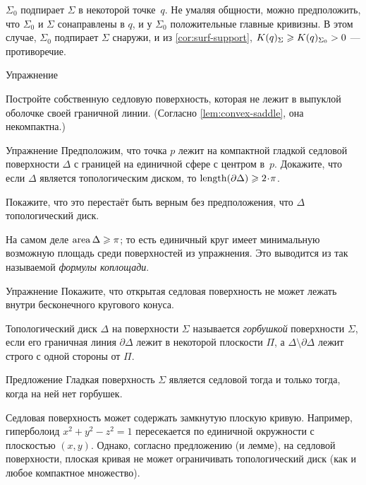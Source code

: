 $\Sigma_0$ подпирает $\Sigma$ в некоторой точке~$q$.
Не умаляя общности, можно предположить, что $\Sigma_0$ и $\Sigma$ сонаправлены в $q$, и у $\Sigma_0$ положительные главные кривизны.
В этом случае, $\Sigma_0$ подпирает $\Sigma$ снаружи,
и из \ref{cor:surf-support}, $K(q)_\Sigma\z\ge K(q)_{\Sigma_0}>0$ --- противоречие.
\qeds


\begin{thm}{Упражнение}\label{ex:proper-saddle}
{\sloppy 
Постройте собственную седловую поверхность, которая не лежит в выпуклой оболочке своей граничной линии.
(Согласно \ref{lem:convex-saddle}, она некомпактна.)

}
\end{thm}

\begin{thm}{Упражнение}\label{ex:length-of-bry}
Предположим, что точка $p$ лежит на компактной гладкой седловой поверхности $\Delta$ с границей на единичной сфере с центром в~$p$.
Докажите, что если $\Delta$ является топологическим диском, то $\length(\partial\Delta)\ge 2\cdot\pi$.

Покажите, что это перестаёт быть верным без предположения, что $\Delta$ топологический диск.
\end{thm}

На самом деле $\mathop{\rm area}\nolimits \Delta\geqslant \pi$;
то есть единичный круг имеет минимальную возможную площадь среди поверхностей из упражнения.
Это выводится из так называемой \emph{формулы коплощади}.

\begin{thm}{Упражнение}\label{ex:circular-cone-saddle}
Покажите, что открытая седловая поверхность
не может лежать внутри бесконечного кругового конуса. 
\end{thm}

Топологический диск $\Delta$ на поверхности $\Sigma$ называется \emph{горбушкой} поверхности $\Sigma$, если его граничная линия $\partial\Delta$ лежит в некоторой плоскости $\Pi$, а $\Delta \setminus \partial \Delta$ лежит строго с одной стороны от $\Pi$.

\begin{thm}{Предложение}\label{prop:hat}
Гладкая поверхность $\Sigma$ является седловой тогда и только тогда, когда на ней нет горбушек.
\end{thm}

Седловая поверхность может содержать замкнутую плоскую кривую.
Например, гиперболоид $x^2+y^2-z^2=1$ пересекается по единичной окружности с плоскостью $(x,y)$.
Однако, согласно предложению (и лемме), на седловой поверхности, плоская кривая не может ограничивать топологический диск (как и любое компактное множество).


